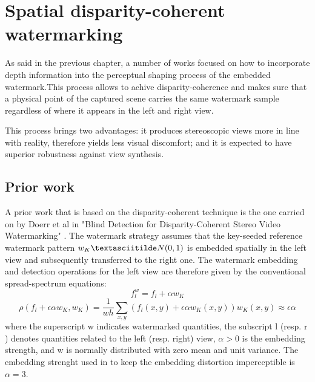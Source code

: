 \chapter{Spatial disparity-coherent watermarking}
\label{spa}



As said in the previous chapter, a number of works focused on how to incorporate depth information into the perceptual shaping process of the embedded watermark.\newline This process allows to achive disparity-coherence and makes sure that a physical point of the captured scene carries the same watermark sample regardless of where it appears in the left and right view.\newline

This process brings two advantages: it produces stereoscopic views more in line with reality, therefore yields less visual discomfort; and it is expected to have superior robustness against view synthesis.\newline

\section{Prior work} 

A prior work that is based on the disparity-coherent technique is the one carried on by Doerr et al in "Blind Detection for Disparity-Coherent
Stereo Video Watermarking" \cite{DOER2}.\newline
The watermark strategy  assumes that the key-seeded reference watermark pattern $w_{K}\textasciitilde N(0, 1)$ is embedded spatially in the left view and subsequently transferred to the right one.\newline
The watermark embedding and detection operations for the left view are therefore given by the conventional spread-spectrum equations:\newline
$$f_{l}^{w} = f_{l}+\alpha w_{K}$$
$$\rho(f_{l}+\epsilon\alpha w_{K},w_{K})= \frac{1}{wh}\sum_{x,y}(f_{l}(x,y)+\epsilon\alpha w_{K}(x,y))w_{K}(x,y)\approx\epsilon\alpha $$
where the superscript w indicates watermarked quantities, the subscript l (resp. r ) denotes quantities related to the left (resp. right) view, $\alpha > 0$ is the embedding strength, and w is normally distributed with zero mean and unit variance.\newline
The embedding strenght used in \cite{DOER2} to keep the embedding distortion imperceptible is $\alpha = 3$.\newline 

